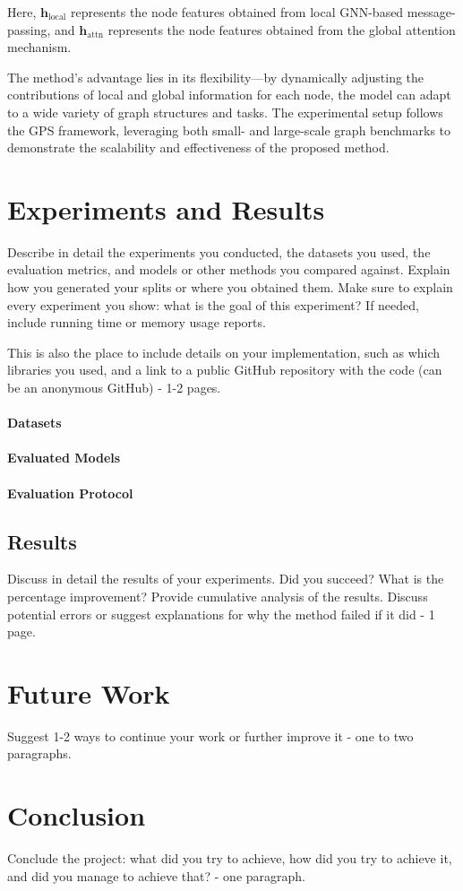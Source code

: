 \documentclass{acmart}
\begin{document}
Here, $\mathbf{h}_{\text{local}}$ represents the node features obtained from local GNN-based message-passing, and $\mathbf{h}_{\text{attn}}$ represents the node features obtained from the global attention mechanism.


The method's advantage lies in its flexibility—by dynamically adjusting the contributions of local and global information for each node, the model can adapt to a wide variety of graph structures and tasks. The experimental setup follows the GPS framework, leveraging both small- and large-scale graph benchmarks to demonstrate the scalability and effectiveness of the proposed method.

\section{Experiments and Results}
Describe in detail the experiments you conducted, the datasets you used, the evaluation metrics, and models or other methods you compared against. Explain how you generated your splits or where you obtained them. Make sure to explain every experiment you show: what is the goal of this experiment? If needed, include running time or memory usage reports.

This is also the place to include details on your implementation, such as which libraries you used, and a link to a public GitHub repository with the code (can be an anonymous GitHub) - 1-2 pages.

\paragraph{Datasets}

\paragraph{Evaluated Models}

\paragraph{Evaluation Protocol}

\subsection{Results}
Discuss in detail the results of your experiments. Did you succeed? What is the percentage improvement? Provide cumulative analysis of the results. Discuss potential errors or suggest explanations for why the method failed if it did - 1 page.

\section{Future Work}
Suggest 1-2 ways to continue your work or further improve it - one to two paragraphs.

\section{Conclusion}
Conclude the project: what did you try to achieve, how did you try to achieve it, and did you manage to achieve that? - one paragraph.



\end{document}
